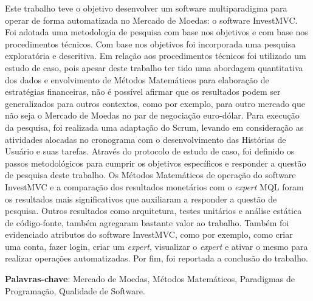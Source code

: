\begin{resumo}
Este trabalho teve o objetivo desenvolver um software multiparadigma para operar de forma automatizada no Mercado de Moedas: o software InvestMVC. Foi adotada uma metodologia de pesquisa com base nos objetivos e com base nos procedimentos técnicos. Com base nos objetivos foi incorporada uma pesquisa exploratória e descritiva. Em relação aos procedimentos técnicos foi utilizado um estudo de caso, pois apesar deste trabalho ter tido uma abordagem quantitativa dos dados e envolvimento de Métodos Matemáticos para elaboração de estratégias financeiras, não é possível afirmar que os resultados podem ser generalizados para outros contextos, como por exemplo, para outro mercado que não seja o Mercado de Moedas no par de negociação euro-dólar. Para execução da pesquisa, foi realizada uma adaptação do Scrum, levando em consideração as atividades alocadas no cronograma com o desenvolvimento das Histórias de Usuário e suas tarefas. Através do protocolo de estudo de caso, foi definido os passos metodológicos para cumprir os objetivos específicos e responder a questão de pesquisa deste trabalho. Os Métodos Matemáticos de operação do software InvestMVC e a comparação dos resultados monetários com o \textit{expert} MQL foram os resultados mais significativos que auxiliaram a responder a questão de pesquisa. Outros resultados como arquitetura, testes unitários e análise estática de código-fonte, também agregaram bastante valor ao trabalho. Também foi evidenciado atributos do software InvestMVC, como por exemplo, como criar uma conta, fazer login, criar um \textit{expert}, visualizar o \textit{expert} e ativar o mesmo para realizar operações automatizadas. Por fim, foi reportada a conclusão do trabalho.

\vspace{\onelineskip}
    
 \noindent
 \textbf{Palavras-chave}: Mercado de Moedas, Métodos Matemáticos, Paradigmas de Programação, Qualidade de Software.
\end{resumo}
